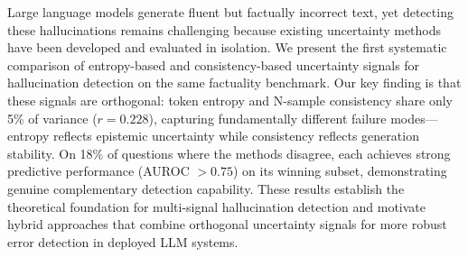 Large language models generate fluent but factually incorrect text, yet detecting these hallucinations remains challenging because existing uncertainty methods have been developed and evaluated in isolation. We present the first systematic comparison of entropy-based and consistency-based uncertainty signals for hallucination detection on the same factuality benchmark. Our key finding is that these signals are orthogonal: token entropy and N-sample consistency share only 5\% of variance ($r = 0.228$), capturing fundamentally different failure modes---entropy reflects epistemic uncertainty while consistency reflects generation stability. On 18\% of questions where the methods disagree, each achieves strong predictive performance (AUROC $> 0.75$) on its winning subset, demonstrating genuine complementary detection capability. These results establish the theoretical foundation for multi-signal hallucination detection and motivate hybrid approaches that combine orthogonal uncertainty signals for more robust error detection in deployed LLM systems.
